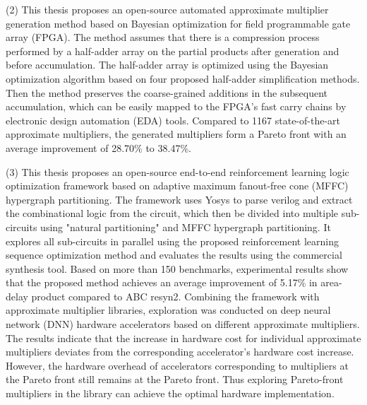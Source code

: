 \begin{abstract*}
      (2) This thesis proposes an open-source automated approximate multiplier generation method based on Bayesian optimization for field programmable gate array (FPGA). The method assumes that there is a compression process performed by a half-adder array on the partial products after generation and before accumulation.
      The half-adder array is optimized using the Bayesian optimization algorithm based on four proposed half-adder simplification methods. Then the method preserves the coarse-grained additions in the subsequent accumulation, which can be easily mapped to the FPGA's fast carry chains by electronic design automation (EDA) tools.
      Compared to 1167 state-of-the-art approximate multipliers, the generated multipliers form a Pareto front with an average improvement of 28.70\% to 38.47\%.
    
      (3) This thesis proposes an open-source end-to-end reinforcement learning logic optimization framework based on adaptive maximum fanout-free cone (MFFC) hypergraph partitioning. The framework uses Yosys to parse verilog and extract the combinational logic from the circuit, which then be divided into multiple sub-circuits using "natural partitioning" and MFFC hypergraph partitioning. It explores all sub-circuits in parallel using the proposed reinforcement learning sequence optimization method and evaluates the results using the commercial synthesis tool. Based on more than 150 benchmarks, experimental results show that the proposed method achieves an average improvement of 5.17\% in area-delay product compared to ABC resyn2. 
      Combining the framework with approximate multiplier libraries, exploration was conducted on deep neural network (DNN) hardware accelerators based on different approximate multipliers. The results indicate that the increase in hardware cost for individual approximate multipliers deviates from the corresponding accelerator's hardware cost increase. However, the hardware overhead of accelerators corresponding to multipliers at the Pareto front still remains at the Pareto front. Thus exploring Pareto-front multipliers in the library can achieve the optimal hardware implementation.
\end{abstract*}